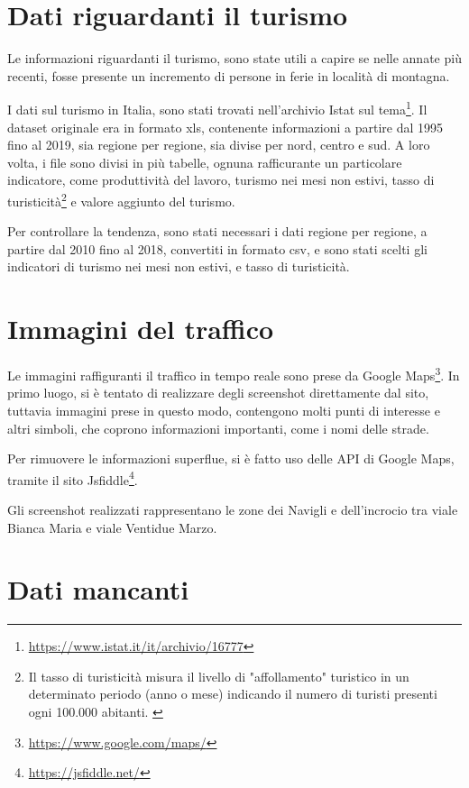 \documentclass[a4paper,12pt]{report}
\begin{document}
\section{Dati riguardanti il turismo}

Le informazioni riguardanti il turismo, sono state utili a capire se nelle annate più 
recenti, fosse presente un incremento di persone in ferie in località di montagna.

I dati sul turismo in Italia, sono stati trovati nell'archivio Istat sul 
tema\footnote{\url{https://www.istat.it/it/archivio/16777}}.
Il dataset originale era in formato xls, contenente informazioni a partire dal 1995 
fino al 2019, sia regione per regione, sia divise per nord, centro e sud.
A loro volta, i file sono divisi in più tabelle, ognuna rafficurante un particolare 
indicatore, come produttività del lavoro, turismo nei mesi non estivi, 
tasso di turisticità\footnote{Il tasso di turisticità misura il livello di "affollamento" 
turistico in un determinato periodo (anno o mese) indicando il numero di turisti presenti 
ogni 100.000 abitanti. \cite{ONTIT:1}} 
e valore aggiunto del turismo.

Per controllare la tendenza, sono stati necessari i dati regione per regione, 
a partire dal 2010 fino al 2018, convertiti in formato csv, e sono stati scelti gli 
indicatori di turismo nei mesi non estivi, e tasso di turisticità. 

\section{Immagini del traffico}

Le immagini raffiguranti il traffico in tempo reale sono prese da Google 
Maps\footnote{\url{https://www.google.com/maps/}}. 
In primo luogo, si è tentato di realizzare degli screenshot direttamente dal sito, 
tuttavia immagini prese in questo modo, contengono molti punti di interesse e altri simboli, 
che coprono informazioni importanti, come i nomi delle strade.

Per rimuovere le informazioni superflue, si è fatto uso delle API di Google Maps, 
tramite il sito Jsfiddle\footnote{\url{https://jsfiddle.net/}}.

Gli screenshot realizzati rappresentano le zone dei Navigli e dell'incrocio tra viale 
Bianca Maria e viale Ventidue Marzo.

\section{Dati mancanti}
\end{document}
